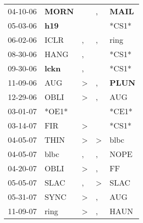 \begin{supertabular}{p{0.07\textwidth}p{0.06\textwidth}p{0.02\textwidth}p{0.02\textwidth}p{0.06\textwidth}}
 04-10-06\textsuperscript{} &  \textbf{MORN\textsuperscript{}} &                  &                , &  \textbf{MAIL\textsuperscript{}} \\
 05-03-06\textsuperscript{} &   \textbf{h19\textsuperscript{}} &                  &                  &                            *CS1* \\
 06-02-06\textsuperscript{} &           ICLR\textsuperscript{} &                , &                , &           ring\textsuperscript{} \\
 08-30-06\textsuperscript{} &           HANG\textsuperscript{} &                , &                  &                            *CS1* \\
 09-30-06\textsuperscript{} &  \textbf{lckn\textsuperscript{}} &                , &                  &                            *CS1* \\
 11-09-06\textsuperscript{} &            AUG\textsuperscript{} &     \textgreater &                , &  \textbf{PLUN\textsuperscript{}} \\
 12-29-06\textsuperscript{} &           OBLI\textsuperscript{} &     \textgreater &                , &            AUG\textsuperscript{} \\
 03-01-07\textsuperscript{} &                            *OE1* &                  &                  &                            *CE1* \\
 03-14-07\textsuperscript{} &            FIR\textsuperscript{} &     \textgreater &                  &                            *CS1* \\
 04-05-07\textsuperscript{} &           THIN\textsuperscript{} &     \textgreater &     \textgreater &           blbc\textsuperscript{} \\
 04-05-07\textsuperscript{} &           blbc\textsuperscript{} &                , &                , &           NOPE\textsuperscript{} \\
 04-20-07\textsuperscript{} &           OBLI\textsuperscript{} &     \textgreater &                , &             FF\textsuperscript{} \\
 05-05-07\textsuperscript{} &           SLAC\textsuperscript{} &                , &     \textgreater &           SLAC\textsuperscript{} \\
 05-31-07\textsuperscript{} &           SYNC\textsuperscript{} &     \textgreater &                , &            AUG\textsuperscript{} \\
 11-09-07\textsuperscript{} &           ring\textsuperscript{} &     \textgreater &                , &           HAUN\textsuperscript{} \\

\end{supertabular}
